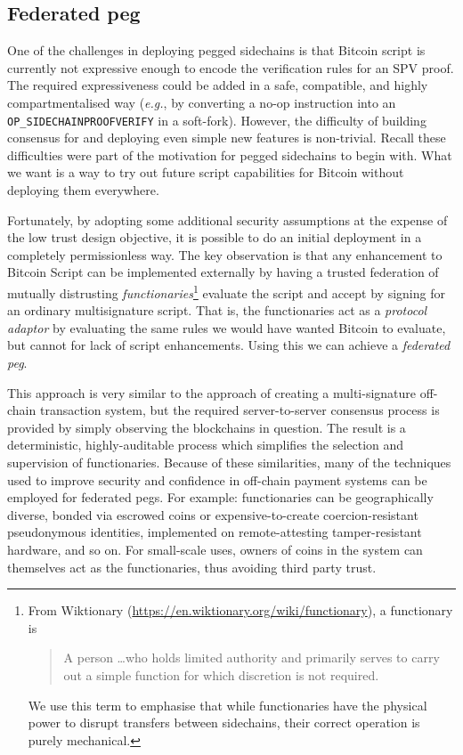 \documentclass[letterpaper]{article}
\newcommand{\sidechains}{sidechains\xspace}
\begin{document}
\begin{appendices}
\section{Federated peg\label{padaptor}}

One of the challenges in deploying pegged sidechains is that Bitcoin script
is currently not expressive enough to encode the verification rules for an SPV
proof.
The required expressiveness could be added in a safe, compatible, and highly
compartmentalised way (\emph{e.g.}, by converting a no-op instruction into an
\texttt{OP\_SIDECHAINPROOFVERIFY} in a soft-fork). However, the
difficulty of building consensus for and deploying even simple new features
is non-trivial. Recall these difficulties were part of the motivation for
pegged sidechains to begin with. What we want is a way to try out future script capabilities for Bitcoin without deploying them everywhere.

Fortunately, by adopting some additional security assumptions at the expense of the low trust design objective, it is possible
to do an initial deployment in a completely permissionless way. The key
observation is that any enhancement to Bitcoin Script can be implemented
externally by having a trusted federation of mutually distrusting
\emph{functionaries}\footnote{
From Wiktionary (\url{https://en.wiktionary.org/wiki/functionary}),
a functionary is
\begin{quote}
A person \ldots who holds limited authority and primarily serves to carry
out a simple function for which discretion is not required.
\end{quote}
We use this term to emphasise that while functionaries have the physical power
to disrupt transfers between \sidechains, their correct operation is purely
mechanical.
} evaluate the script and accept by signing for an ordinary multisignature script. That is, the functionaries act as a \emph{protocol
adaptor} by evaluating the same rules we would have wanted Bitcoin to evaluate,
but cannot for lack of script enhancements. Using this we can achieve a
\emph{federated peg}.

This approach is very similar to the approach of creating a multi-signature
off-chain transaction system, but the required server-to-server consensus
process is provided by simply observing the blockchains in question.
The result is a deterministic, highly-auditable process which simplifies the
selection and supervision of functionaries. Because of these similarities, many
of the techniques used to improve security and confidence in off-chain
payment systems can be employed for federated pegs. For example:
functionaries can be geographically diverse, bonded via escrowed coins or
expensive-to-create coercion-resistant pseudonymous identities, implemented on remote-attesting tamper-resistant hardware, and so on\cite{Todd2013}.
For small-scale uses, owners of coins in the system can themselves act as the functionaries, thus avoiding third party trust.


\end{appendices}
\end{document}
